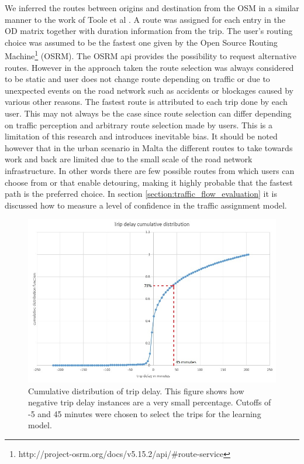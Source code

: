 \documentclass[12pt, a4paper]{report}
\theoremstyle{definition}
\theoremstyle{definition}%
\theoremstyle{definition}%
\theoremstyle{definition}%
\theoremstyle{definition}%
\theoremstyle{definition}%
\begin{document}

We inferred the routes between origins and destination from the OSM in a similar manner to the work of Toole et al \cite{Toole2015}. A route was assigned for each entry in the OD matrix together with duration information from the trip. The user's routing choice was assumed to be the fastest one given by the Open Source Routing Machine\footnote{http://project-osrm.org/docs/v5.15.2/api/\#route-service} (OSRM). The OSRM api provides the possibility to request alternative routes. However in the approach taken the route selection was always considered to be static and user does not change route depending on traffic or due to  unexpected events on the road network such as accidents or blockages caused by various other reasons. The fastest route is attributed to each trip done by each user. This may not always be the case since route selection can differ depending on traffic perception and arbitrary route selection made by users. This is a limitation of this research and introduces inevitable bias. It should be noted however that in the urban scenario in Malta the different routes to take towards work and back are limited due to the small scale of the road network infrastructure. In other words there are few possible routes from which users can choose from or that enable detouring, making it highly probable that the fastest path is the preferred choice. In section \ref{section:traffic_flow_evaluation} it is discussed how to measure a level of confidence in the traffic assignment model.


\begin{figure}[hp]	
	\includegraphics[scale=0.60]{Trip_delay_cumm_distribution.jpg}
	\centering
	\caption[Trip delay cumulative distribution]{Cumulative distribution of trip delay. This figure shows how negative trip delay instances are a very small percentage. Cutoffs  of -5 and 45 minutes were chosen to select the trips for the learning model.  }
	\label{fig:trip_delay_cum_distribution}
\end{figure}
\end{document}

